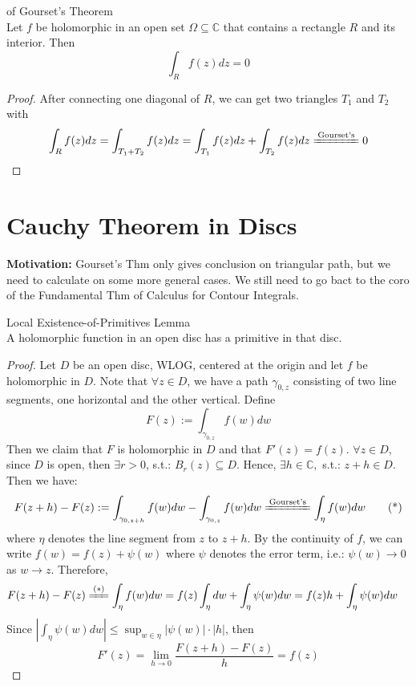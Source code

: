 \begin{corollary}{of Gourset's Theorem}\\
Let $f$ be holomorphic in an open set $\Omega \subseteq \mathbb{C}$ that contains a rectangle $R$ and its interior. Then
\[
\int_R f(z)dz=0
\]
\end{corollary}

\begin{proof}
    After connecting one diagonal of $R$, we can get two triangles $T_1$ and $T_2$ with
    \[
    \int_Rf(z)dz= \int_{T_1+T_2} f(z)dz= \int _{T_1} f(z)dz+ \int_{T_2}f(z)dz\xlongequal{\text{Gourset's}}0
    \]
\end{proof}

\section{Cauchy Theorem in Discs}

\noindent\textbf{Motivation:} Gourset's Thm only gives conclusion on triangular path, but we need to calculate on some more general cases. We still need to go bact to the coro of the Fundamental Thm of Calculus for Contour Integrals.

\begin{lemma}{Local Existence-of-Primitives Lemma}\\
A holomorphic function in an open disc has a primitive in that disc.
\end{lemma}

\begin{proof}
    Let $D$ be an open disc, WLOG, centered at the origin and let $f$ be holomorphic in $D$. Note that $\forall z\in D$, we have a path $\gamma_{0,z}$ consisting of two line segments, one horizontal and the other vertical. Define
    \[
    F(z):= \int_{\gamma_{0,z}} f(w)dw
    \]
    Then we claim that $F$ is holomorphic in $D$ and that $F'(z)=f(z)$. $\forall z\in D$, since $D$ is open, then $\exists r>0$, s.t.: $B_r(z) \subseteq D$. Hence, $\exists h\in \mathbb{C},$ s.t.: $z+h\in D$. Then we have:
    \begin{equation*}
        F(z+h)-F(z):= \int_{\gamma_{0,z+h}} f(w)dw- \int_{\gamma_{0,z}}f(w)dw \xlongequal{\text{Gourset's}} \int_{\eta} f(w)dw \tag{*}
    \end{equation*}
    where $\eta$ denotes the line segment from $z$ to $z+h$. By the continuity of $f$, we can write $f(w)=f(z)+ \psi(w)$ where $\psi$ denotes the error term, i.e.: $\psi(w) \to 0$ as $w\to z$. Therefore, 
    \begin{align*}
        F(z+h)- F(z) &\xlongequal{(*)} \int_{\eta} f(w)dw= f(z) \int_{\eta} dw+ \int_\eta \psi(w)dw= f(z) h+\int_\eta \psi(w)dw
    \end{align*}
    Since $|\int_\eta \psi(w)dw|\leq \sup_{w\in \eta} |\psi(w)| \cdot |h|$, then
    \[
    F'(z)= \lim_{h\to 0} \frac{F(z+h) -F(z)}{h}=f(z)
    \]
\end{proof}

